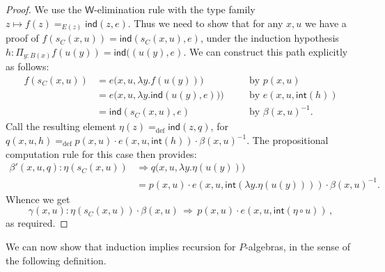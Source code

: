 \documentclass[10pt,a4paper,oneside,reqno]{amsart}
\numberwithin{equation}{section}
\theoremstyle{mythm}
\theoremstyle{mydef}
\theoremstyle{myrmk}
\newcommand{\by}[1]{\quad&&\text{by {$#1$}}}
\newcommand{\deq}{=}
\newcommand{\peq}{\Rightarrow}
\newcommand{\defeq}{=_{\mathrm{def}}}
\renewcommand{\int}{\mathsf{int}}
\newcommand{\prd}[1]{\Pi_{#1}}
\newcommand{\W}{\mathsf{W}}
\newcommand{\ind}{\mathsf{ind}}
\begin{document}
\begin{proof}
We use the $\W$-elimination rule with the type family $z \mapsto f(z) =_{E(z)} \ind(z,e)$. Thus we need to show that for any $x,u$ we have a proof of $f(s_C(x,u)) = \ind(s_C(x,u),e)$, under the induction hypothesis $h : \prd{y:B(x)} f(u(y)) = \ind((u(y),e)$. We can construct this path explicitly as follows:
\begin{align*}
f(s_C(x,u)) &= e\big(x,u,\lambda y.f(u(y))\big) \by{p(x,u)}\\
	&= e\big(x,u,\lambda y.\ind(u(y),e))\big) \by{e(x,u,\int(h))}\\
	&= \ind(s_C(x,u),e) \by{\beta(x,u)^{-1}}.
\end{align*}
Call the resulting element $\eta(z) \defeq \ind(z,q)$, for $q(x,u,h) \defeq p(x,u)\cdot e(x,u,\int(h))\cdot\beta(x,u)^{-1}$.
The propositional computation rule for this case then provides:
\begin{align*}
\beta'(x,u,q) :  \eta(s_C(x,u)) &\peq q\big(x,u,\lambda{y}.\eta(u(y))\big)\\
	&\deq p(x,u)\cdot e(x,u,\int(\lambda y.\eta(u(y))))\cdot\beta(x,u)^{-1}.
\end{align*}
Whence we get
\[
\gamma (x,u) :  \eta(s_C(x,u)) \cdot \beta(x,u)\,\peq\,
 	p(x,u)\cdot e(x,u,\int(\eta\circ u))\, ,
	\]
as required.
\end{proof}

We can now show that induction implies recursion for $P$-algebras, in the sense of the following definition.
\end{document}

